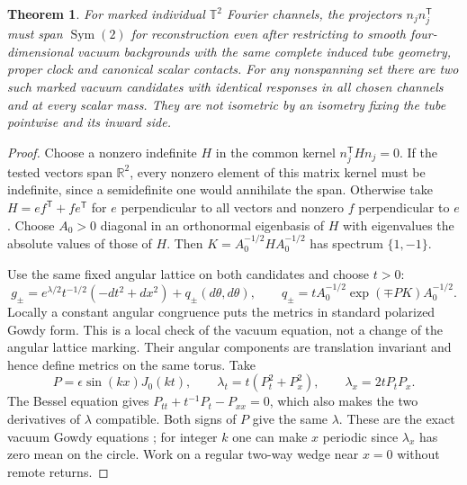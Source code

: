 \documentclass[11pt]{article}
\newtheorem{theorem}{Theorem}
\begin{document}
\begin{theorem}\label{thm:gowdy}
For marked individual \(\mathbb T^2\) Fourier channels, the projectors \(n_j n_j^{\mathsf T}\) must span \(\operatorname{Sym}(2)\) for reconstruction even after restricting to smooth four-dimensional vacuum backgrounds with the same complete induced tube geometry, proper clock and canonical scalar contacts. For any nonspanning set there are two such marked vacuum candidates with identical responses in all chosen channels and at every scalar mass. They are not isometric by an isometry fixing the tube pointwise and its inward side.
\end{theorem}
\begin{proof}
Choose a nonzero indefinite \(H\) in the common kernel \(n_j^{\mathsf T}Hn_j=0\). If the tested vectors span \(\mathbb R^2\), every nonzero element of this matrix kernel must be indefinite, since a semidefinite one would annihilate the span. Otherwise take \(H=e f^{\mathsf T}+f e^{\mathsf T}\) for \(e\) perpendicular to all vectors and nonzero \(f\) perpendicular to \(e\). Choose \(A_0>0\) diagonal in an orthonormal eigenbasis of \(H\) with eigenvalues the absolute values of those of \(H\). Then \(K=A_0^{-1/2}H A_0^{-1/2}\) has spectrum \(\{1,-1\}\).

Use the same fixed angular lattice on both candidates and choose \(t>0\):
\[
 g_\pm=e^{\lambda/2}t^{-1/2}(-dt^2+dx^2)+q_\pm(d\theta,d\theta),
 \qquad
 q_\pm=tA_0^{-1/2}\exp(\mp P K)A_0^{-1/2}.
\]
Locally a constant angular congruence puts the metrics in standard polarized Gowdy form. This is a local check of the vacuum equation, not a change of the angular lattice marking. Their angular components are translation invariant and hence define metrics on the same torus. Take
\[
 P=\epsilon\sin(kx)J_0(kt),\qquad
 \lambda_t=t(P_t^2+P_x^2),\qquad
 \lambda_x=2tP_tP_x .
\]
The Bessel equation gives \(P_{tt}+t^{-1}P_t-P_{xx}=0\), which also makes the two derivatives of \(\lambda\) compatible. Both signs of \(P\) give the same \(\lambda\). These are the exact vacuum Gowdy equations \cite[\S III]{GreenWald}; for integer \(k\) one can make \(x\) periodic since \(\lambda_x\) has zero mean on the circle. Work on a regular two-way wedge near \(x=0\) without remote returns.


\end{proof}
\end{document}
